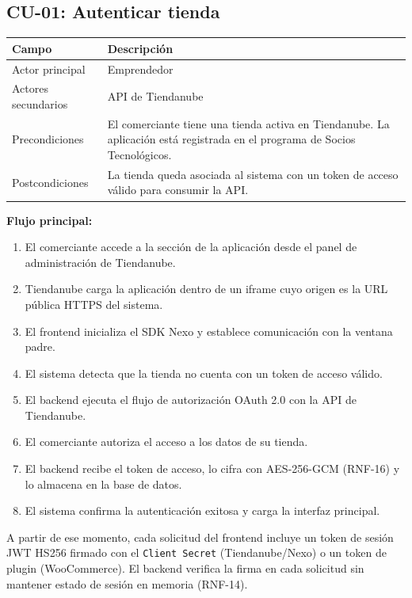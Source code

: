 \subsection{CU-01: Autenticar tienda}
\label{sec:cu-01}

\begin{table}[h]
\centering
\renewcommand{\arraystretch}{1.3}
\begin{tabular}{|m{3cm}|m{11.3cm}|}
\hline
\textbf{Campo} & \textbf{Descripción} \\
\hline
Actor principal & Emprendedor \\
\hline
Actores secundarios & API de Tiendanube \\
\hline
Precondiciones & El comerciante tiene una tienda activa en Tiendanube. La aplicación está registrada en el programa de Socios Tecnológicos. \\
\hline
Postcondiciones & La tienda queda asociada al sistema con un token de acceso válido para consumir la API. \\
\hline
\end{tabular}
\end{table}

\noindent\textbf{Flujo principal:}
\begin{enumerate}
    \item El comerciante accede a la sección de la aplicación desde el panel de administración de Tiendanube.
    \item Tiendanube carga la aplicación dentro de un iframe cuyo origen es la URL pública HTTPS del sistema.
    \item El frontend inicializa el SDK Nexo y establece comunicación con la ventana padre.
    \item El sistema detecta que la tienda no cuenta con un token de acceso válido.
    \item El backend ejecuta el flujo de autorización OAuth 2.0 con la API de Tiendanube.
    \item El comerciante autoriza el acceso a los datos de su tienda.
    \item El backend recibe el token de acceso, lo cifra con AES-256-GCM (RNF-16) y lo almacena en la base de datos.
    \item El sistema confirma la autenticación exitosa y carga la interfaz principal.
\end{enumerate}

\noindent A partir de ese momento, cada solicitud del frontend incluye un token de sesión JWT HS256 firmado con el \texttt{Client Secret} (Tiendanube/Nexo) o un token de plugin (WooCommerce). El backend verifica la firma en cada solicitud sin mantener estado de sesión en memoria (RNF-14).


